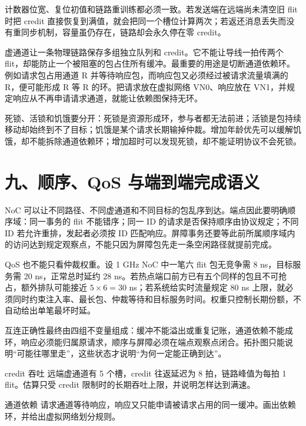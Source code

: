 计数器位宽、复位初值和链路重训练都必须一致。若发送端在远端尚未清空旧 flit 时把 credit 直接恢复到满值，就会把同一个槽位计算两次；若返还消息丢失而没有重同步机制，容量虽仍存在，链路却会永久停在零 credit。


虚通道让一条物理链路保存多组独立队列和 credit。它不能让导线一拍传两个 flit，却能防止一个被阻塞的包占住所有缓冲。最重要的用途是切断通道依赖环。例如请求包占用通道 R 并等待响应包，而响应包又必须经过被请求流量填满的 R，便可能形成 R 等 R 的环。把请求放在虚拟网络 VN0、响应放在 VN1，并规定响应从不再申请请求通道，就能让依赖图保持无环。

死锁、活锁和饥饿要分开：死锁是资源形成环，参与者都无法前进；活锁是包持续移动却始终到不了目标；饥饿是某个请求长期输掉仲裁。增加年龄优先可以缓解饥饿，却不能拆除通道依赖环；增加超时可以发现死锁，却不能证明协议不会死锁。

\section{九、顺序、QoS 与端到端完成语义}

NoC 可以让不同路径、不同虚通道和不同目标的包乱序到达。端点因此要明确顺序域：同一事务的 flit 不能错序；同一 ID 的请求是否保持顺序由协议规定；不同 ID 若允许重排，发起者必须按 ID 匹配响应。屏障事务还要等此前所属顺序域内的访问达到规定观察点，不能只因为屏障包先走一条空闲路径就提前完成。

QoS 也不能只看仲裁权重。设 1 GHz NoC 中一笔六 flit 包无竞争需 8 ns，目标服务需 20 ns，正常总时延约 28 ns。若热点端口前方已有五个同样的包且不可抢占，额外排队可能接近 $5\times6=30$ ns；若系统给实时流量规定 80 ns 上限，就必须同时约束注入率、最长包、仲裁等待和目标服务时间。权重只控制长期份额，不自动给出单笔最坏时延。

\begin{keyidea}
互连正确性最终由四组不变量组成：缓冲不能溢出或重复记账，通道依赖不能成环，响应必须能归属原请求，顺序与屏障必须在端点观察点闭合。拓扑图只能说明“可能往哪里走”，这些状态才说明“为何一定能正确到达”。
\end{keyidea}

\begin{chapterexercise}{credit 吞吐}
远端虚通道有 5 个槽，credit 往返延迟为 8 拍，链路峰值为每拍 1 flit。估算只受 credit 限制时的长期吞吐上限，并说明怎样达到满速。
\end{chapterexercise}

\begin{chapterexercise}{通道依赖}
请求通道等待响应，响应又只能申请被请求占用的同一缓冲。画出依赖环，并给出虚拟网络划分规则。
\end{chapterexercise}

